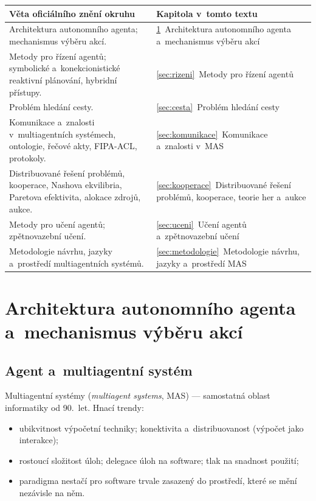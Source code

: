 \documentclass[11pt,a4paper]{article}
\theoremstyle{definition}
\begin{document}
\begin{center}
\small
\begin{tabular}{p{} p{}}
\toprule
\textbf{Věta oficiálního znění okruhu} & \textbf{Kapitola v~tomto textu} \\
\midrule
Architektura autonomního agenta; mechanismus výběru akcí.
  & \ref{sec:architektura}~Architektura autonomního agenta a~mechanismus výběru akcí \\
Metody pro řízení agentů; symbolické a~konekcionistické reaktivní plánování, hybridní
přístupy.
  & \ref{sec:rizeni}~Metody pro řízení agentů \\
Problém hledání cesty.
  & \ref{sec:cesta}~Problém hledání cesty \\
Komunikace a~znalosti v~multiagentních systémech, ontologie, řečové akty, FIPA-ACL,
protokoly.
  & \ref{sec:komunikace}~Komunikace a~znalosti v~MAS \\
Distribuované řešení problémů, kooperace, Nashova ekvilibria, Paretova efektivita, alokace
zdrojů, aukce.
  & \ref{sec:kooperace}~Distribuované řešení problémů, kooperace, teorie her a~aukce \\
Metody pro učení agentů; zpětnovazební učení.
  & \ref{sec:uceni}~Učení agentů a~zpětnovazební učení \\
Metodologie návrhu, jazyky a~prostředí multiagentních systémů.
  & \ref{sec:metodologie}~Metodologie návrhu, jazyky a~prostředí MAS \\
\bottomrule
\end{tabular}
\end{center}

\tableofcontents
\newpage

\section{Architektura autonomního agenta a~mechanismus výběru akcí}
\label{sec:architektura}

\subsection{Agent a~multiagentní systém}

Multiagentní systémy (\emph{multiagent systems}, MAS) --- samostatná oblast informatiky od
90.~let. Hnací trendy:
\begin{itemize}
\item ubikvitnost výpočetní techniky; konektivita a~distribuovanost (výpočet jako interakce);
\item rostoucí složitost úloh; delegace úloh na software; tlak na snadnost použití;
\item paradigma  nestačí pro software trvale
  zasazený do prostředí, které se mění nezávisle na něm.
\end{itemize}
\end{document}
